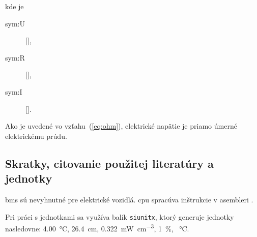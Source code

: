 kde je

\begin{description}
	\item[\gls{sym:U}]  [],
	\item[\gls{sym:R}]  [],
	\item[\gls{sym:I}]  [].
\end{description}


Ako je uvedené vo vzťahu~(\ref{eq:ohm}), elektrické napätie je priamo úmerné elektrickému prúdu.

\subsection{Skratky, citovanie použitej literatúry a jednotky}

\gls{bms} sú nevyhnutné pre elektrické vozidlá. \gls{cpu} spracúva inštrukcie v asembleri \cite{nuclearfissionuranium235, JAYABAL2024103121}.

Pri práci s jednotkami sa využíva balík \texttt{siunitx}, ktorý generuje jednotky nasledovne: \SI{4.00}{\celsius}, \SI{26.4}{\centi\metre}, \SI{0.322}{\milli\watt\per\cubic\centi\metre}, \SI{1}{\percent}, \SI{}{\celsius}.